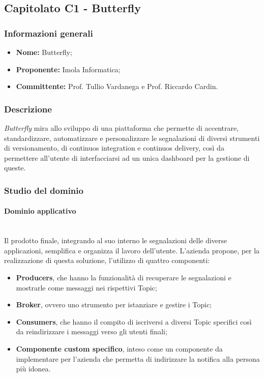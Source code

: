 \subsection{Capitolato C1 - Butterfly}
\subsubsection{Informazioni generali}
\begin{itemize}
\item
\textbf{Nome:} Butterfly;
\item
\textbf{Proponente:} Imola Informatica;
\item
\textbf{Committente:} Prof. Tullio Vardanega e Prof. Riccardo Cardin.
\end{itemize}
\subsubsection{Descrizione}
\textit{Butterfly} mira allo sviluppo di una piattaforma che permette di
 accentrare, standardizzare, automatizzare e personalizzare le segnalazioni di
 diversi strumenti di versionamento, di continuos integration e continuos
 delivery, così da permettere all'utente di interfacciarsi ad un unica 
 dashboard per la gestione di queste.
\subsubsection{Studio del dominio}
\paragraph{Dominio applicativo}\mbox{}\\
Il prodotto finale, integrando al suo interno le segnalazioni delle diverse 
applicazioni, semplifica e organizza il lavoro dell'utente. L'azienda propone,
per la realizzazione di questa soluzione, l'utilizzo di quattro componenti:
\begin{itemize}
	\item \textbf{Producers}, che hanno la funzionalità di recuperare le
	segnalazioni e mostrarle come messaggi nei rispettivi Topic;
	\item \textbf{Broker}, ovvero uno strumento per istanziare e gestire i
	 Topic;
	\item \textbf{Consumers}, che hanno il compito di iscriversi a diversi
	Topic specifici così da reindirizzare i messaggi verso gli utenti finali;
    \item \textbf{Componente custom specifico}, inteso come un componente da
    implementare per l'azienda che permetta di indirizzare la notifica alla
    persona più idonea.
\end{itemize}
